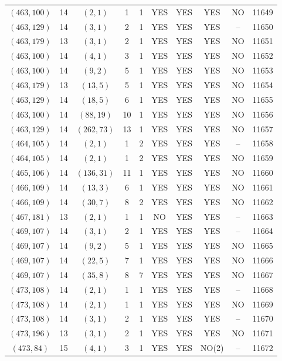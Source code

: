 \begin{longtable}{|c|c|c|c|c|c|c|c|c|c|}
$(463, 100)$ & 14 & $(2, 1)$ & 1 & 1 & YES & YES & YES & NO & 11649\\
$(463, 129)$ & 14 & $(3, 1)$ & 2 & 1 & YES & YES & YES & -- & 11650\\
$(463, 179)$ & 13 & $(3, 1)$ & 2 & 1 & YES & YES & YES & NO & 11651\\
$(463, 100)$ & 14 & $(4, 1)$ & 3 & 1 & YES & YES & YES & NO & 11652\\
$(463, 100)$ & 14 & $(9, 2)$ & 5 & 1 & YES & YES & YES & NO & 11653\\
$(463, 179)$ & 13 & $(13, 5)$ & 5 & 1 & YES & YES & YES & NO & 11654\\
$(463, 129)$ & 14 & $(18, 5)$ & 6 & 1 & YES & YES & YES & NO & 11655\\
$(463, 100)$ & 14 & $(88, 19)$ & 10 & 1 & YES & YES & YES & NO & 11656\\
$(463, 129)$ & 14 & $(262, 73)$ & 13 & 1 & YES & YES & YES & NO & 11657\\
$(464, 105)$ & 14 & $(2, 1)$ & 1 & 2 & YES & YES & YES & -- & 11658\\
$(464, 105)$ & 14 & $(2, 1)$ & 1 & 2 & YES & YES & YES & NO & 11659\\
$(465, 106)$ & 14 & $(136, 31)$ & 11 & 1 & YES & YES & YES & NO & 11660\\
$(466, 109)$ & 14 & $(13, 3)$ & 6 & 1 & YES & YES & YES & NO & 11661\\
$(466, 109)$ & 14 & $(30, 7)$ & 8 & 2 & YES & YES & YES & NO & 11662\\
$(467, 181)$ & 13 & $(2, 1)$ & 1 & 1 & NO & YES & YES & -- & 11663\\
$(469, 107)$ & 14 & $(3, 1)$ & 2 & 1 & YES & YES & YES & -- & 11664\\
$(469, 107)$ & 14 & $(9, 2)$ & 5 & 1 & YES & YES & YES & NO & 11665\\
$(469, 107)$ & 14 & $(22, 5)$ & 7 & 1 & YES & YES & YES & NO & 11666\\
$(469, 107)$ & 14 & $(35, 8)$ & 8 & 7 & YES & YES & YES & NO & 11667\\
$(473, 108)$ & 14 & $(2, 1)$ & 1 & 1 & YES & YES & YES & -- & 11668\\
$(473, 108)$ & 14 & $(2, 1)$ & 1 & 1 & YES & YES & YES & NO & 11669\\
$(473, 108)$ & 14 & $(3, 1)$ & 2 & 1 & YES & YES & YES & -- & 11670\\
$(473, 196)$ & 13 & $(3, 1)$ & 2 & 1 & YES & YES & YES & NO & 11671\\
$(473, 84)$ & 15 & $(4, 1)$ & 3 & 1 & YES & YES & NO(2) & -- & 11672\\

\end{longtable}
